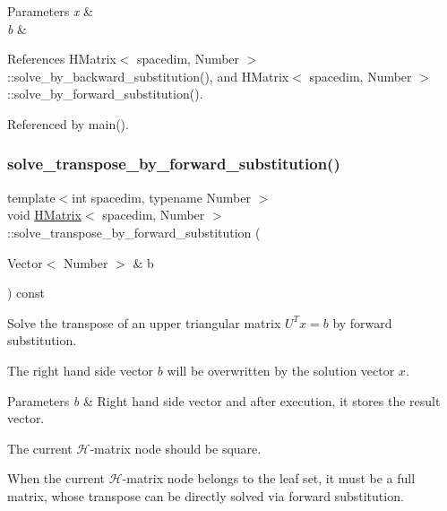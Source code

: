 \begin{DoxyParams}{Parameters}
{\em x} & \\
\hline
{\em b} & \\
\hline
\end{DoxyParams}


References H\+Matrix$<$ spacedim, Number $>$\+::solve\+\_\+by\+\_\+backward\+\_\+substitution(), and H\+Matrix$<$ spacedim, Number $>$\+::solve\+\_\+by\+\_\+forward\+\_\+substitution().



Referenced by main().

\mbox{\label{classHMatrix_a624fc153099a20572a655457d4f81b70}} 
\subsubsection{\texorpdfstring{solve\+\_\+transpose\+\_\+by\+\_\+forward\+\_\+substitution()}{solve\_transpose\_by\_forward\_substitution()}\hspace{0.1cm}{\footnotesize\ttfamily [1/4]}}
{\footnotesize\ttfamily template$<$int spacedim, typename Number $>$ \\
void \hyperlink{classHMatrix}{H\+Matrix}$<$ spacedim, Number $>$\+::solve\+\_\+transpose\+\_\+by\+\_\+forward\+\_\+substitution (\begin{DoxyParamCaption}\item[{Vector$<$ Number $>$ \&}]{b }\end{DoxyParamCaption}) const}

Solve the transpose of an upper triangular matrix $U^Tx=b$ by forward substitution.

The right hand side vector $b$ will be overwritten by the solution vector $x$.


\begin{DoxyParams}{Parameters}
{\em b} & Right hand side vector and after execution, it stores the result vector. \\
\hline
\end{DoxyParams}
The current $\mathcal{H}$-\/matrix node should be square.

When the current $\mathcal{H}$-\/matrix node belongs to the leaf set, it must be a full matrix, whose transpose can be directly solved via forward substitution.

